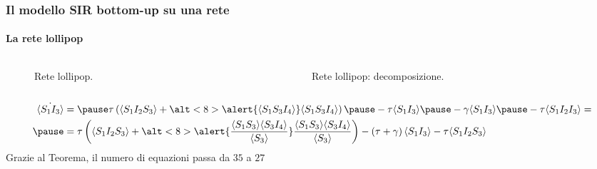 \documentclass{beamer}
\newcommand{\angol}[1]{\langle #1 \rangle}
\newcommand{\tonde}[1]{\left( #1 \right)}
\theoremstyle{definition}
\theoremstyle{plain}
\begin{document}
\begin{frame}
\frametitle{Il modello SIR bottom-up su una rete}
\framesubtitle{La rete lollipop}
\begin{columns}
\begin{column}{0.5\textwidth}
   \begin{figure}
\centering
{}
\caption{Rete lollipop.}
\end{figure}

\end{column}
\pause
\begin{column}{0.5\textwidth}  %
\begin{figure}[!htb]
\centering
{}
\caption{Rete lollipop: decomposizione.}
\end{figure}
\end{column}
\end{columns}
\pause
\begin{equation*}
 \begin{aligned}	
 \dot{\angol{S_1I_3}}&=
 \pause  \tau \tonde{ \angol{S_1I_2S_3} +
  \alt<8>
  {\alert{\angol{S_1S_3I_4}}}
  {\angol{S_1S_3I_4}} }
   \pause -  \tau  \angol{S_1I_3} \pause - \gamma\angol{S_1 I_3}\pause -\tau \angol{ S_1 I_2 I_3}= \\ \pause
 &= \tau \tonde{ \angol{S_1I_2S_3} +
 \alt<8>{\alert{
  \frac{\angol{S_1S_3}\angol{S_3 I_4}}{\angol{S_3}}}}
  {\frac{\angol{S_1S_3}\angol{S_3 I_4}}{\angol{S_3}}  }
  } -\tonde{ \tau + \gamma} \angol{S_1I_3} - \tau \angol{S_1I_2S_3}
 \end{aligned}
 \end{equation*}
\pause
Grazie al Teorema,  il numero di equazioni passa da $35$ a $27$
\end{frame}
\end{document}
